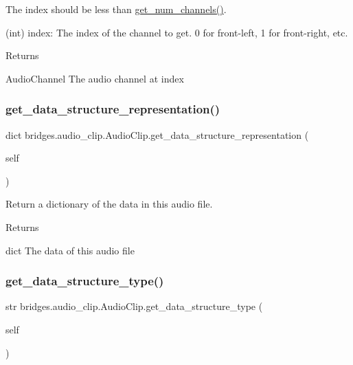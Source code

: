 The index should be less than \mbox{\hyperlink{classbridges_1_1audio__clip_1_1_audio_clip_ad04346faa0d3bcb18028847a2b9c8617}{get\+\_\+num\+\_\+channels()}}. \begin{DoxyVerb}       (int) index: The index of the channel to get. 0 for front-left, 1 for front-right, etc.
\end{DoxyVerb}
 \begin{DoxyReturn}{Returns}


Audio\+Channel The audio channel at index 
\end{DoxyReturn}
\mbox{\label{classbridges_1_1audio__clip_1_1_audio_clip_afed6c31ac64c4dbd892cce7b5abb8ba9}} 
\subsubsection{\texorpdfstring{get\_data\_structure\_representation()}{get\_data\_structure\_representation()}}
{\footnotesize\ttfamily  dict bridges.\+audio\+\_\+clip.\+Audio\+Clip.\+get\+\_\+data\+\_\+structure\+\_\+representation (\begin{DoxyParamCaption}\item[{}]{self }\end{DoxyParamCaption})}



Return a dictionary of the data in this audio file. 

\begin{DoxyReturn}{Returns}


dict The data of this audio file 
\end{DoxyReturn}
\mbox{\label{classbridges_1_1audio__clip_1_1_audio_clip_a258ddac138761543fa0ad27496025b12}} 
\subsubsection{\texorpdfstring{get\_data\_structure\_type()}{get\_data\_structure\_type()}}
{\footnotesize\ttfamily  str bridges.\+audio\+\_\+clip.\+Audio\+Clip.\+get\+\_\+data\+\_\+structure\+\_\+type (\begin{DoxyParamCaption}\item[{}]{self }\end{DoxyParamCaption})}



